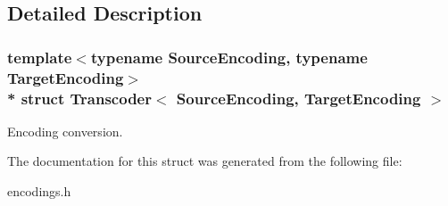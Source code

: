 \subsection{Detailed Description}
\subsubsection*{template$<$typename Source\+Encoding, typename Target\+Encoding$>$\\*
struct Transcoder$<$ Source\+Encoding, Target\+Encoding $>$}

Encoding conversion. 

The documentation for this struct was generated from the following file\+:\begin{DoxyCompactItemize}
\item 
encodings.\+h\end{DoxyCompactItemize}
